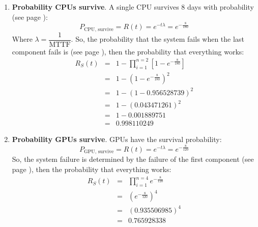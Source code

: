 \begin{enumerate}
\begin{center}
    \end{center}
    \begin{enumerate}
        \item \textbf{Probability CPUs survive}. A single CPU survives 8 days with probability (see page \pageref{eq: failure rate}):
        \begin{equation*}
            P_{\text{CPU, survive}} = R(t) = e^{-t \lambda} = e^{-\frac{8}{180}}
        \end{equation*}
        Where $\lambda = \dfrac{1}{\text{MTTF}}$. So, the probability that the system fails when the last component fails is (see page \pageref{eq: system fails when the last component fails - parallel}), then the probability that everything works:
        \begin{equation*}
            \begin{array}{rcl}
                R_S(t) &=& 1 - \displaystyle\prod_{i=1}^{n = 2} \left[1 - e^{-\frac{8}{180}}\right] \\ [1.3em]
                &=& 1 - \left(1 - e^{-\frac{8}{180}}\right)^{2} \\ [.8em]
                &=& 1 - \left(1 - 0.956528739\right)^{2} \\ [.3em]
                &=& 1 - \left(0.043471261\right)^{2} \\ [.3em]
                &=& 1 - 0.001889751 \\ [.3em]
                &=& 0.998110249
            \end{array}
        \end{equation*}

        \newpage

        \item \textbf{Probability GPUs survive}. GPUs have the survival probability:
        \begin{equation*}
            P_{\text{GPU, survive}} = R(t) = e^{-t \lambda} = e^{-\frac{8}{120}}
        \end{equation*}
        So, the system failure is determined by the failure of the first component (see page \pageref{eq: system fails when the last component fails - sequential}), then the probability that everything works:
        \begin{equation*}
            \begin{array}{rcl}
                R_S(t) &=& \displaystyle\prod_{i=1}^{n=4} e^{-\frac{8}{120}} \\ [1.3em]
                &=& \left(e^{-\frac{8}{120}}\right)^{4} \\ [.8em]
                &=& \left(0.935506985\right)^{4} \\ [.3em]
                &=& 0.765928338
            \end{array}
        \end{equation*}


\end{enumerate}
\end{enumerate}
